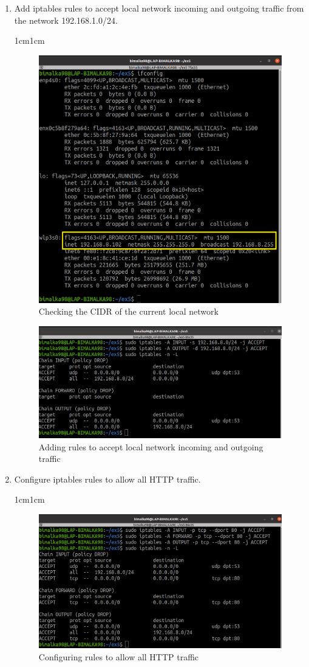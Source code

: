 \documentclass[11pt,letterpaper]{article}
\newenvironment{answer}{\em \color{blue} \begin{adjustwidth}{1cm}{1cm}}{\end{adjustwidth}}
\begin{document}
\begin{enumerate}
		\item Add iptables rules to accept local network incoming and outgoing traffic from the network 192.168.1.0/24. 
		\begin{answer}
			
			\begin{figure}[H]
				\centering
				\includegraphics[width=0.65\columnwidth]{images/part1/ifconfig.png}
				\caption{Checking the CIDR of the current local network}
			\end{figure}
			
			\begin{figure}[H]
				\centering
				\includegraphics[width=0.65\columnwidth]{images/part1/7.png}
				\caption{Adding rules to accept local network incoming and outgoing traffic}
			\end{figure}
		\end{answer}
		\pagebreak
		\item Configure iptables rules to allow all HTTP traffic.
		\begin{answer}
			\begin{figure}[H]
				\centering
				\includegraphics[width=0.65\columnwidth]{images/part1/8.png}
				\caption{Configuring rules to allow all HTTP traffic}
				\label{fig:8}
			\end{figure}
		\end{answer}
		

\end{enumerate}
\end{document}
